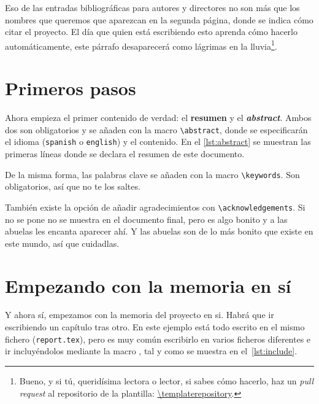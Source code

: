 \documentclass[%
    school=etsisi,%
    type=tfg,%
    degree=61CD,%
]{upm-report}
\begin{document}
Eso de las entradas bibliográficas para autores y directores no son más
que los nombres que queremos que aparezcan en la segunda página, donde
se indica cómo citar el proyecto. El día que quien está escribiendo esto
aprenda cómo hacerlo automáticamente, este párrafo desaparecerá como
lágrimas en la lluvia\footnote{Bueno, y si tú, queridísima lectora o
lector, si sabes cómo hacerlo, haz un \textit{pull request} al
repositorio de la plantilla: \url{\templaterepository}.}.

\section{Primeros pasos}

Ahora empieza el primer contenido de verdad: el \textbf{resumen} y el
\textbf{\textit{abstract}}. Ambos dos son obligatorios y se añaden con
la macro \lstinline{\abstract}, donde se especificarán el idioma
(\texttt{spanish} o \texttt{english}) y el contenido. En el
\autoref{lst:abstract} se muestran las primeras líneas donde se declara
el resumen de este documento.



De la misma forma, las palabras clave se añaden con la macro
\lstinline{\keywords}. Son obligatorios, así que no te los saltes.



También existe la opción de añadir agradecimientos con
\lstinline{\acknowledgements}. Si no se pone no se muestra en el
documento final, pero es algo bonito y a las abuelas les encanta
aparecer ahí. Y las abuelas son de lo más bonito que existe en este
mundo, así que cuidadlas.

\section{Empezando con la memoria en sí}

Y ahora sí, empezamos con la memoria del proyecto en si. Habrá que ir
escribiendo un capítulo tras otro. En este ejemplo está todo escrito en
el mismo fichero (\texttt{report.tex}), pero es muy común escribirlo en
varios ficheros diferentes e ir incluyéndolos mediante la macro
\lstinline{}, tal y como se muestra en el~\autoref{lst:include}.
\end{document}
